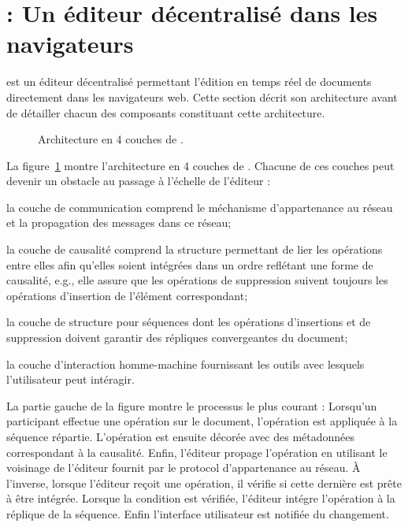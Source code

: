 
\section{\CRATE : Un éditeur décentralisé dans les navigateurs}
\label{editor:sec:crate}

\CRATE est un éditeur décentralisé permettant l'édition en temps réel de
documents directement dans les navigateurs web. Cette section décrit son
architecture avant de détailler chacun des composants constituant cette
architecture.


\begin{figure}
  \begin{center}
    
    \caption{\label{editor:fig:architecture}Architecture en 4 couches de \CRATE.}
  \end{center}
\end{figure}

La figure~\ref{editor:fig:architecture} montre l'architecture en 4 couches de
\CRATE. Chacune de ces couches peut devenir un obstacle au passage à l'échelle
de l'éditeur :
\begin{inparaenum}[(i)]
\item la couche de communication comprend le méchanisme d'appartenance au réseau
  et la propagation des messages dans ce réseau;
\item la couche de causalité comprend la structure permettant de lier les
  opérations entre elles afin qu'elles soient intégrées dans un ordre reflétant
  une forme de causalité, e.g., elle assure que les opérations de suppression
  suivent toujours les opérations d'insertion de l'élément correspondant;
\item la couche de structure pour séquences dont les opérations d'insertions et
  de suppression doivent garantir des répliques convergeantes du document;
\item la couche d'interaction homme-machine fournissant les outils avec lesquels
  l'utilisateur peut intéragir.
\end{inparaenum}

La partie gauche de la figure montre le processus le plus courant : Lorsqu'un
participant effectue une opération sur le document, l'opération est appliquée à
la séquence répartie. L'opération est ensuite décorée avec des métadonnées
correspondant à la causalité. Enfin, l'éditeur propage l'opération en utilisant
le voisinage de l'éditeur fournit par le protocol d'appartenance au réseau.  À
l'inverse, lorsque l'éditeur reçoit une opération, il vérifie si cette dernière
est prête à être intégrée. Lorsque la condition est vérifiée, l'éditeur intégre
l'opération à la réplique de la séquence. Enfin l'interface utilisateur est
notifiée du changement.

